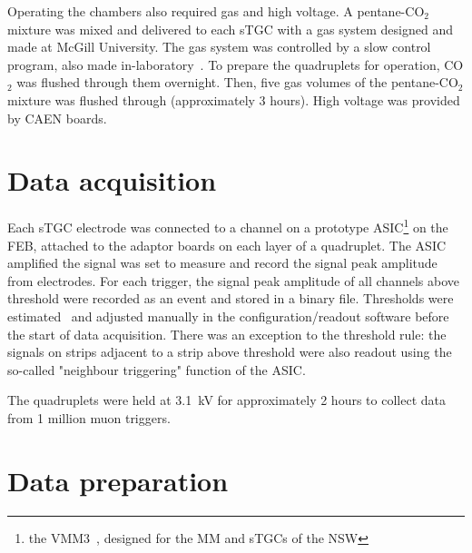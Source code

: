 Operating the chambers also required gas and high voltage. A pentane-CO$_{2}$ mixture was mixed and delivered to each sTGC with a gas system designed and made at McGill University. The gas system was controlled by a slow control program, also made in-laboratory~\cite{keyes_development_2017}. To prepare the quadruplets for operation, CO$_{2}$ was flushed through them overnight. Then, five gas volumes of the pentane-CO$_{2}$ mixture was flushed through (approximately 3 hours). High voltage was provided by CAEN boards. 


\section{Data acquisition}
Each sTGC electrode was connected to a channel on a prototype ASIC\footnote{the VMM3~\cite{iakovidis_vmm3_2017}, designed for the MM and sTGCs of the NSW} on the FEB, attached to the adaptor boards on each layer of a quadruplet.  The ASIC amplified the signal was set to measure and record the signal peak amplitude from electrodes. For each trigger, the signal peak amplitude of all channels above threshold were recorded as an event and stored in a binary file. Thresholds were estimated~\cite{chen_calibration_2019} and adjusted manually in the configuration/readout software before the start of data acquisition. There was an exception to the threshold rule: the signals on strips adjacent to a strip above threshold were also readout using the so-called "neighbour triggering" function of the ASIC. 

The quadruplets were held at 3.1~kV for approximately 2 hours to collect data from 1 million muon triggers.

\section{Data preparation}
